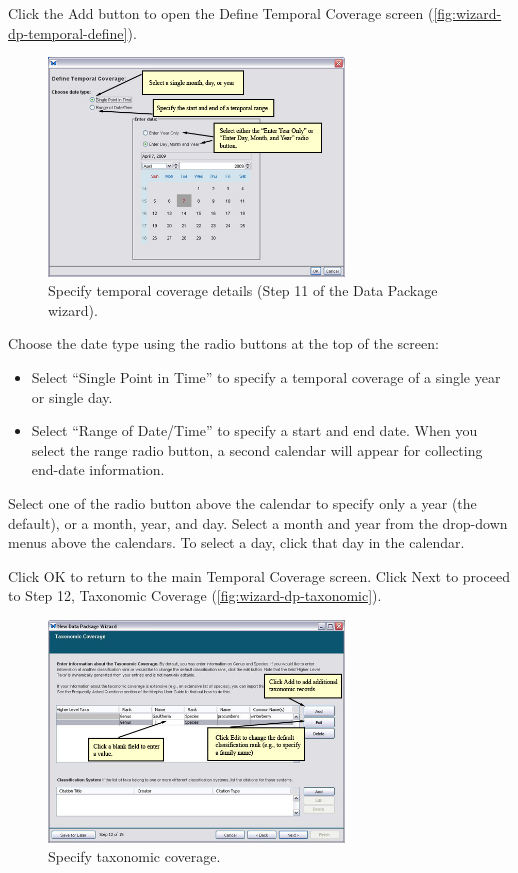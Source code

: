 Click the Add button to open the Define Temporal Coverage screen
(\autoref{fig:wizard-dp-temporal-define}).

\begin{figure}
  \centering
    \includegraphics[width=0.7\textwidth]{images/wizard-dp-temporal-define.jpg}
  \caption{Specify temporal coverage details (Step 11 of the Data
    Package wizard).}
  \label{fig:wizard-dp-temporal-define}
\end{figure}

Choose the date type using the radio buttons at the top of the screen:
\begin{itemize}
  \setlength{\parskip}{1pt}
  \item Select ``Single Point in Time'' to specify a temporal coverage
    of a single year or single day. 
  \item Select ``Range of Date/Time'' to specify a start and end date.
    When you select the range radio button, a second calendar will
    appear for collecting end-date information.
\end{itemize}

Select one of the radio button above the calendar to specify only a year
(the default), or a month, year, and day. Select a month and year from
the drop-down menus above the calendars. To select a day, click that day
in the calendar. 

Click OK to return to the main Temporal Coverage screen. Click Next to
proceed to Step 12, Taxonomic Coverage
(\autoref{fig:wizard-dp-taxonomic}).

\begin{figure}
  \centering
    \includegraphics[width=0.7\textwidth]{images/wizard-dp-taxonomic.jpg}
  \caption{Specify taxonomic coverage.}
  \label{fig:wizard-dp-taxonomic}
\end{figure}

